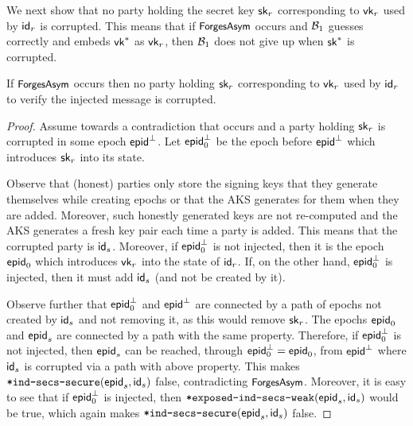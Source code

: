 We next show that no party holding the secret key $\erssk_r$ corresponding to $\ersvk_r$ used by $\id_r$ is corrupted. This means that if $\forgesa$ occurs and $\Bdv[1]$ guesses correctly and embeds $\ersvk^*$ as $\ersvk_r$, then $\Bdv[1]$ does not give up when $\erssk^*$ is corrupted.
\begin{claim}
  If $\forgesa$ occurs then no party holding $\erssk_r$ corresponding to $\ersvk_r$ used by $\id_r$ to verify the injected message is corrupted.
\end{claim}
\begin{proof}
  Assume towards a contradiction that \forgesa occurs and a party holding $\erssk_r$ is corrupted in some epoch $\hgnodeid^\bot$. Let $\hgnodeid_0^\bot$ be the epoch before $\hgnodeid^\bot$ which introduces $\erssk_r$ into its state.

  Observe that (honest) parties only store the signing keys that they generate themselves while creating epochs or that the AKS generates for them when they are added. Moreover, such honestly generated keys are not re-computed and the AKS generates a fresh key pair each time a party is added.
  This means that the corrupted party is $\id_s$. Moreover, if $\hgnodeid_0^\bot$ is not injected, then it is the epoch $\hgnodeid_0$ which introduces $\ersvk_r$ into the state of $\id_r$. If, on the other hand, $\hgnodeid_0^\bot$ is injected, then it must add $\id_s$ (and not be created by it).

  Observe further that $\hgnodeid_0^\bot$ and $\hgnodeid^\bot$ are connected by a path of epochs not created by $\id_s$ and not removing it, as this would remove $\erssk_r$. The epochs $\hgnodeid_0$ and $\hgnodeid_s$ are connected by a path with the same property. Therefore, if $\hgnodeid_0^\bot$ is not injected, then $\hgnodeid_s$ can be reached, through $\hgnodeid_0^\bot=\hgnodeid_0$, from $\hgnodeid^\bot$ where $\id_s$ is corrupted via a path with above property. This makes $\safeIndSecsSecure(\hgnodeid_s, \id_s)$ false, contradicting $\forgesa$.
  Moreover, it is easy to see that if $\hgnodeid_0^\bot$ is injected, then $\safeWeakAdd(\hgnodeid_s,\id_s)$ would be true, which again makes $\safeIndSecsSecure(\hgnodeid_s, \id_s)$ false.
\end{proof}


